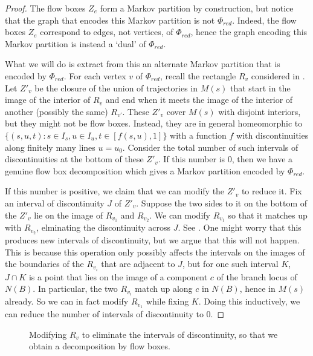 \documentclass[12pt]{amsart}
\theoremstyle{definition}
\numberwithin{equation}{section}
\begin{document}
\begin{proof}
The flow boxes $Z_e$ form a Markov partition by construction, but notice that the graph that encodes this Markov partition is not $\Phi_{red}$. Indeed, the flow boxes $Z_e$ correspond to edges, not vertices, of $\Phi_{red}$, hence the graph encoding this Markov partition is instead a `dual' of $\Phi_{red}$. 

What we will do is extract from this an alternate Markov partition that is encoded by $\Phi_{red}$. For each vertex $v$ of $\Phi_{red}$, recall the rectangle $R_v$ considered in . Let $Z'_v$ be the closure of the union of trajectories in $M(s)$ that start in the image of the interior of $R_v$ and end when it meets the image of the interior of another (possibly the same) $R_{v'}$. These $Z'_v$ cover $M(s)$ with disjoint interiors, but they might not be flow boxes. Instead, they are in general homeomorphic to $\{(s,u,t): s \in I_s, u \in I_u, t \in [f(s,u),1]\}$ with a function $f$ with discontinuities along finitely many lines $u=u_0$. Consider the total number of such intervals of discontinuities at the bottom of these $Z'_v$. If this number is $0$, then we have a genuine flow box decomposition which gives a Markov partition encoded by $\Phi_{red}$. 

If this number is positive, we claim that we can modify the $Z'_v$ to reduce it. Fix an interval of discontinuity $J$ of $Z'_v$. Suppose the two sides to it on the bottom of the $Z'_v$ lie on the image of $R_{v_1}$ and $R_{v_2}$. We can modify $R_{v_1}$ so that it matches up with $R_{v_2}$, elminating the discontinuity across $J$. See . One might worry that this produces new intervals of discontinuity, but we argue that this will not happen. This is because this operation only possibly affects the intervals on the images of the boundaries of the $R_{v_i}$ that are adjacent to $J$, but for one such interval $K$, $J \cap K$ is a point that lies on the image of a component $c$ of the branch locus of $N(B)$. In particular, the two $R_{v_i}$ match up along $c$ in $N(B)$, hence in $M(s)$ already. So we can in fact modify $R_{v_1}$ while fixing $K$. Doing this inductively, we can reduce the number of intervals of discontinuity to $0$.
\end{proof}

\begin{figure}
    \centering
    \fontsize{12pt}{12pt}\selectfont
    \resizebox{!}{8cm}{}
    \caption{Modifying $R_v$ to eliminate the intervals of discontinuity, so that we obtain a decomposition by flow boxes.}
    \label{fig:markovpartarg}
\end{figure}
\end{document}

